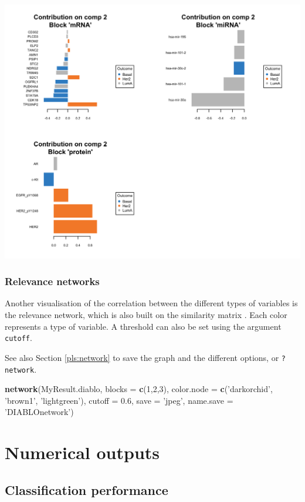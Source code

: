 \documentclass[]{book}
\newenvironment{Shaded}{\begin{snugshade}}{\end{snugshade}}
\newcommand{\KeywordTok}[1]{\textcolor[rgb]{0.13,0.29,0.53}{\textbf{#1}}}
\newcommand{\DataTypeTok}[1]{\textcolor[rgb]{0.13,0.29,0.53}{#1}}
\newcommand{\DecValTok}[1]{\textcolor[rgb]{0.00,0.00,0.81}{#1}}
\newcommand{\FloatTok}[1]{\textcolor[rgb]{0.00,0.00,0.81}{#1}}
\newcommand{\StringTok}[1]{\textcolor[rgb]{0.31,0.60,0.02}{#1}}
\newcommand{\NormalTok}[1]{#1}
\theoremstyle{definition}
\theoremstyle{definition}
\theoremstyle{definition}
\theoremstyle{remark}
\begin{document}
\begin{center}\includegraphics[width=0.5\linewidth]{Figures/unnamed-chunk-9-1} \end{center}

\subsubsection{Relevance networks}\label{relevance-networks}

Another visualisation of the correlation between the different types of
variables is the relevance network, which is also built on the
similarity matrix \citep{Gon12}. Each color represents a type of
variable. A threshold can also be set using the argument
\texttt{cutoff}.

See also Section \ref{pls:network} to save the graph and the different
options, or \texttt{?network}.

\begin{Shaded}
\begin{Highlighting}[]
\KeywordTok{network}\NormalTok{(MyResult.diablo, }\DataTypeTok{blocks =} \KeywordTok{c}\NormalTok{(}\DecValTok{1}\NormalTok{,}\DecValTok{2}\NormalTok{,}\DecValTok{3}\NormalTok{),}
        \DataTypeTok{color.node =} \KeywordTok{c}\NormalTok{(}\StringTok{'darkorchid'}\NormalTok{, }\StringTok{'brown1'}\NormalTok{, }\StringTok{'lightgreen'}\NormalTok{), }
        \DataTypeTok{cutoff =} \FloatTok{0.6}\NormalTok{, }\DataTypeTok{save =} \StringTok{'jpeg'}\NormalTok{, }\DataTypeTok{name.save =} \StringTok{'DIABLOnetwork'}\NormalTok{)}
\end{Highlighting}
\end{Shaded}

\section{Numerical outputs}\label{numerical-outputs}

\subsection{Classification
performance}\label{classification-performance}
\end{document}
